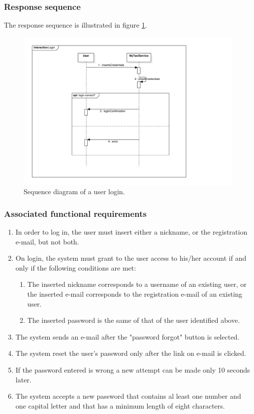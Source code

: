\subsubsection{Response sequence}
The response sequence is illustrated in figure \ref{fig:sequence-login}.
\begin{figure}
\includegraphics[width=\textwidth]{diagrams/sequence_login.pdf}
\caption{Sequence diagram of a user login.}
\label{fig:sequence-login}
\end{figure}

\subsubsection{Associated functional requirements}
\begin{enumerate}
    \item In order to log in, the user must insert either a nickname, or the registration e-mail, but not both.
    \item On login, the system must grant to the user access to his/her account if and only if the following conditions are met:
    \begin{enumerate}
    	\item The inserted nickname corresponds to a username of an existing user, or the inserted e-mail corresponds to the registration e-mail of an existing user.
	\item The inserted password is the same of that of the user identified above.
    \end{enumerate}
    \item The system sends an e-mail after the "password forgot" button is selected.
    \item The system reset the user's password only after the link on e-mail is clicked.
    \item If the password entered is wrong a new attempt can be made only 10 seconds later.
    \item The system accepts a new password that contains al least one number and one capital letter and that has a minimum length of eight characters.
\end{enumerate}